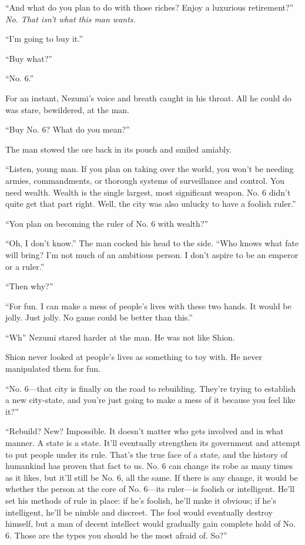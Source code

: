 ``And what do you plan to do with those riches? Enjoy a luxurious
retirement?'' \emph{No. That isn't what this man wants.}

``I'm going to buy it.''

``Buy what?''

``No. 6.''

For an instant, Nezumi's voice and breath caught in his throat. All he
could do was stare, bewildered, at the man.

``Buy No. 6? What do you mean?''

The man stowed the ore back in its pouch and smiled amiably.

``Listen, young man. If you plan on taking over the world, you won't be
needing armies, commandments, or thorough systems of surveillance and
control. You need wealth. Wealth is the single largest, most significant
weapon. No. 6 didn't quite get that part right. Well, the city was also
unlucky to have a foolish ruler.''

``You plan on becoming the ruler of No. 6 with wealth?''

``Oh, I don't know.'' The man cocked his head to the side. ``Who knows
what fate will bring? I'm not much of an ambitious person. I don't
aspire to be an emperor or a ruler.''

``Then why?''

``For fun. I can make a mess of people's lives with these two hands. It
would be jolly. Just jolly. No game could be better than this.''

``Wh\el '' Nezumi stared harder at the man. He was not like Shion.

Shion never looked at people's lives as something to toy with. He never
manipulated them for fun.

``No. 6---that city is finally on the road to rebuilding. They're trying
to establish a new city-state, and you're just going to make a mess of
it because you feel like it?''

``Rebuild? New? Impossible. It doesn't matter who gets involved and in
what manner. A state is a state. It'll eventually strengthen its
government and attempt to put people under its rule. That's the true
face of a state, and the history of humankind has proven that fact to
us. No. 6 can change its robe as many times as it likes, but it'll still
be No. 6, all the same. If there is any change, it would be whether the
person at the core of No. 6---its ruler---is foolish or intelligent. He'll
set his methods of rule in place: if he's foolish, he'll make it
obvious; if he's intelligent, he'll be nimble and discreet. The fool
would eventually destroy himself, but a man of decent intellect would
gradually gain complete hold of No. 6. Those are the types you should be
the most afraid of. So?''

